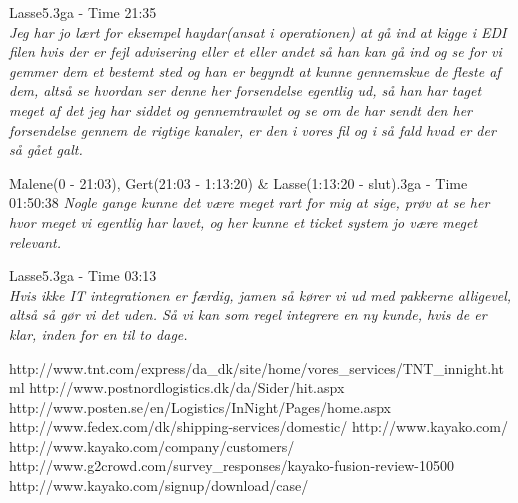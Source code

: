 \begin{thebibliography}{9}
	Lasse5.3ga - Time 21:35 \\
	\textit{Jeg har jo lært for eksempel haydar(ansat i operationen) at gå ind at kigge i EDI filen hvis der er fejl advisering eller et eller andet så han kan gå ind og se for vi gemmer dem et bestemt sted og han er begyndt at kunne gennemskue de fleste af dem, altså se hvordan ser denne her forsendelse egentlig ud, så han har taget meget af det jeg har siddet og gennemtrawlet og se om de har sendt den her forsendelse gennem de rigtige kanaler, er den i vores fil og i så fald hvad er der så gået galt.}

	Malene(0 - 21:03), Gert(21:03 - 1:13:20) \& Lasse(1:13:20 - slut).3ga - Time 01:50:38
	\textit{Nogle gange kunne det være meget rart for mig at sige, prøv at se her hvor meget vi egentlig har lavet, og her kunne et ticket system jo være meget relevant.}

	Lasse5.3ga - Time 03:13 \\
	\textit{Hvis ikke IT integrationen er færdig, jamen så kører vi ud med pakkerne alligevel, altså så gør vi det uden. Så vi kan som regel integrere en ny kunde, hvis de er klar, inden for en til to dage.}

	http://www.tnt.com/express/da\_dk/site/home/vores\_services/TNT\_innight.html
	http://www.postnordlogistics.dk/da/Sider/hit.aspx
	http://www.posten.se/en/Logistics/InNight/Pages/home.aspx
	http://www.fedex.com/dk/shipping-services/domestic/
	http://www.kayako.com/
	http://www.kayako.com/company/customers/
	http://www.g2crowd.com/survey\_responses/kayako-fusion-review-10500
	http://www.kayako.com/signup/download/case/


\end{thebibliography}
